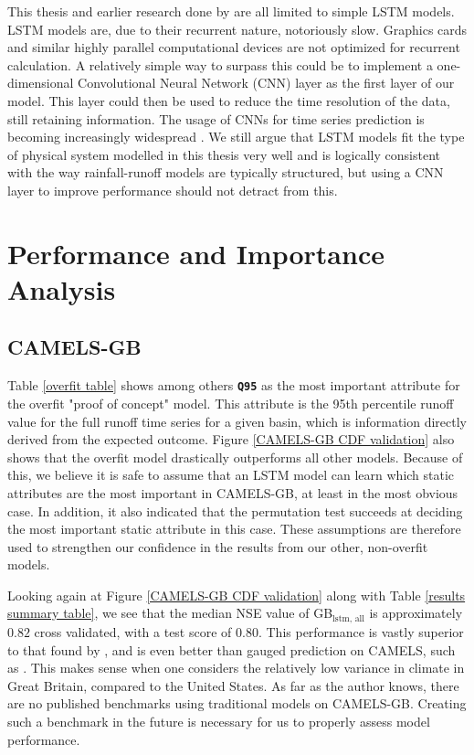 This thesis and earlier research done by \citet{lstm_first_paper,lstm_second_paper,lstm_third_paper} 
are all limited to simple LSTM models. LSTM models are, due to their recurrent nature, 
notoriously slow. Graphics cards and similar highly parallel computational devices 
are not optimized for recurrent calculation. A relatively 
simple way to surpass this could be to implement a one-dimensional 
Convolutional Neural Network (CNN) layer as the first layer of our model. This 
layer could then be used to reduce the time resolution of the data, still retaining 
information. The usage of CNNs for time series prediction is becoming increasingly
widespread \citationneeded. We still argue that LSTM models fit the type of
physical system modelled in this thesis very well and is logically consistent 
with the way rainfall-runoff 
models are typically structured, but using a CNN layer to improve performance 
should not detract from this.

\section{Performance and Importance Analysis}
\label{discuss static attributes}
\subsection{CAMELS-GB}
Table \ref{overfit table} shows among others \textbf{\texttt{Q95}} as the most 
important attribute for the overfit "proof of concept" model. This attribute is the 
95th percentile runoff value for the full runoff time series for a given basin, 
which is information directly derived from the expected outcome. 
Figure \ref{CAMELS-GB CDF validation} also shows that the overfit model drastically 
outperforms all other models.
Because of this, we believe it is 
safe to assume that an LSTM model can learn which static attributes are 
the most important in CAMELS-GB, at least in the most obvious case. In addition, 
it also indicated that the permutation test succeeds at deciding the most important 
static attribute in this case. These assumptions are therefore used to strengthen 
our confidence in the results from our other, non-overfit models. 

Looking again at Figure \ref{CAMELS-GB CDF validation} along with Table 
\ref{results summary table}, we see that the median NSE value of GB$_\text{lstm, all}$ 
is approximately $0.82$ cross validated, with a test score of $0.80$. 
This performance is vastly superior to that found by \citet{lstm_third_paper}, and 
is even better than gauged prediction on CAMELS, such as \citet{lstm_second_paper}. 
This makes sense when one considers the relatively low variance in climate in Great 
Britain, compared to the United States. 
As far as the author knows, there are no published benchmarks using traditional models on 
CAMELS-GB. Creating such a benchmark in the future is necessary for us to properly 
assess model performance.

